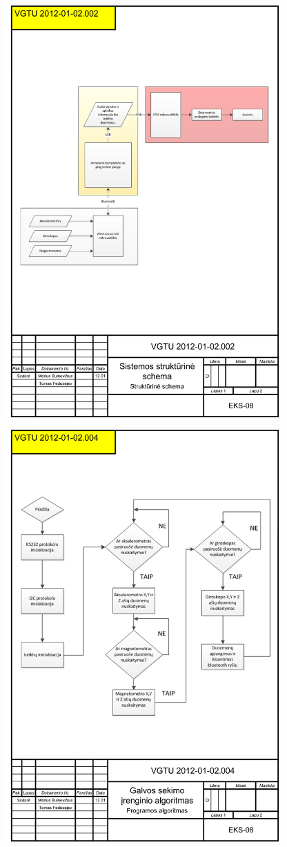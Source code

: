 \documentclass[]{vgtuef}
\begin{document}
\begin{figure}[!h]
  \centering
  \includegraphics[width=400px]{img/priedas_strukturine_schema.png}
\end{figure}

\begin{figure}[!h]
  \centering
  \includegraphics[width=400px]{img/priedas_head_algoritmas.png}
\end{figure}
\end{document}
